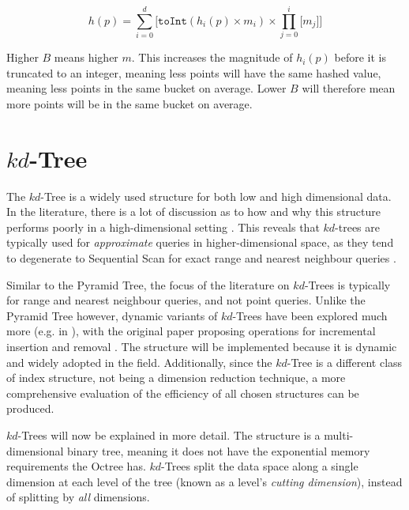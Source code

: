 \begin{equation}
	h(p) = \sum_{i = 0}^{d} { \lbrack \texttt{toInt}( h_i(p) \times m_i ) \times \prod_{j=0}^{i}{\lbrack m_j \rbrack} \rbrack }
	\label{eq:pseudo-pyramid-hash}
\end{equation}

Higher $B$ means higher $m$. This increases the magnitude of $h_i(p)$ before it is truncated to an integer, meaning less points will have the same hashed value, meaning less points in the same bucket on average. Lower $B$ will therefore mean more points will be in the same bucket on average.

\section{$kd$-Tree}
\label{sec:kd-tree-chosen}

The $kd$-Tree is a widely used structure for both low and high dimensional data. In the literature, there is a lot of discussion as to how and why this structure performs poorly in a high-dimensional setting \cite{highd-nn, search-highd-analysis}. This reveals that $kd$-trees are typically used for \textit{approximate} queries in higher-dimensional space, as they tend to degenerate to Sequential Scan for exact range and nearest neighbour queries \cite{similarity-searching}. 

Similar to the Pyramid Tree, the focus of the literature on $kd$-Trees is typically for range and nearest neighbour queries, and not point queries. Unlike the Pyramid Tree however, dynamic variants of $kd$-Trees have been explored much more (e.g. in \cite{bkd-tree, kdb-tree}), with the original paper proposing operations for incremental insertion and removal \cite{kd-tree}. The structure will be implemented because it is dynamic and widely adopted in the field. Additionally, since the $kd$-Tree is a different class of index structure, not being a dimension reduction technique, a more comprehensive evaluation of the efficiency of all chosen structures can be produced.

$kd$-Trees will now be explained in more detail. The structure is a multi-dimensional binary tree, meaning it does not have the exponential memory requirements the Octree has. $kd$-Trees split the data space along a single dimension at each level of the tree (known as a level's \textit{cutting dimension}), instead of splitting by \textit{all} dimensions.

